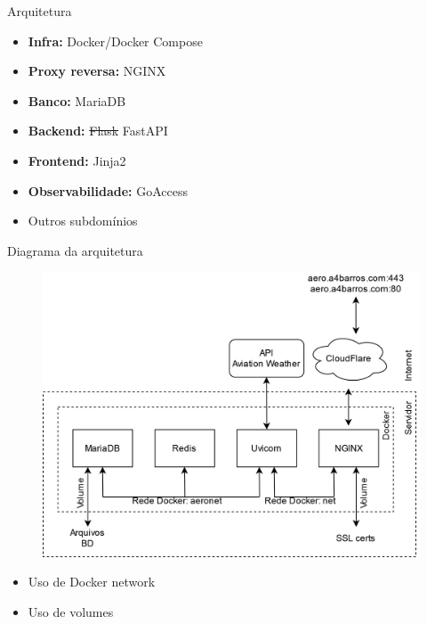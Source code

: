 \documentclass{beamer}
\begin{document}
\begin{frame}{Arquitetura}
    \begin{itemize}
        \item \textbf{Infra:} Docker/Docker Compose
        \pause
        \item \textbf{Proxy reversa:} NGINX
        \pause
        \item \textbf{Banco:} MariaDB
        \pause
        \item \textbf{Backend:} \st{Flask} FastAPI
        \pause
        \item \textbf{Frontend:} Jinja2
        \pause
        \item \textbf{Observabilidade:} GoAccess
        \item Outros subdomínios
    \end{itemize}
\end{frame}

\begin{frame}{Diagrama da arquitetura}
    \begin{figure}[ht]
        \begin{center}
        \includegraphics[width=0.5\linewidth]{img/arquitetura.png}
        \label{fig:arquitetura}
        \end{center}
    \end{figure}
    \begin{itemize}
        \item Uso de Docker network
        \item Uso de volumes
    \end{itemize}
\end{frame}
\end{document}
